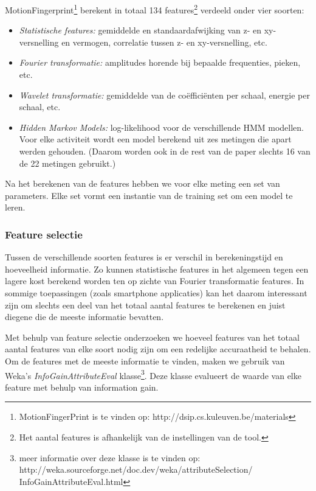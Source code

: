 \documentclass{article}
\begin{document}
MotionFingerprint\footnote{MotionFingerPrint is te vinden op: http://dsip.cs.kuleuven.be/materials} berekent in totaal 134 features\footnote{Het aantal features is afhankelijk van de instellingen van de tool.} verdeeld onder vier soorten:
\begin{itemize}
\item \textit{Statistische features:} gemiddelde en standaardafwijking van z- en xy-versnelling en vermogen, correlatie tussen z- en xy-versnelling, etc. 
 
\item \textit{Fourier transformatie:} amplitudes horende bij bepaalde frequenties, pieken, etc.

\item \textit{Wavelet transformatie:} gemiddelde van de co\"effici\"enten per schaal, energie per schaal, etc.

\item \textit{Hidden Markov Models:} log-likelihood voor de verschillende HMM modellen. Voor elke activiteit wordt een model berekend uit zes metingen die apart werden gehouden. (Daarom worden ook in de rest van de paper slechts 16 van de 22 metingen gebruikt.)
\end{itemize}


Na het berekenen van de features hebben we voor elke meting een set van parameters. Elke set vormt een instantie van de training set om een model te leren.

\subsubsection{Feature selectie}
Tussen de verschillende soorten features is er verschil in berekeningstijd en hoeveelheid informatie. Zo kunnen statistische features in het algemeen tegen een lagere kost berekend worden ten op zichte van Fourier transformatie features. In sommige toepassingen (zoals smartphone applicaties) kan het daarom interessant zijn om slechts een deel van het totaal aantal features te berekenen en juist diegene die de meeste informatie bevatten.

Met behulp van feature selectie onderzoeken we hoeveel features van het totaal aantal features van elke soort nodig zijn om een redelijke accuraatheid te behalen. Om de features met de meeste informatie te vinden, maken we gebruik van Weka's \emph{InfoGainAttributeEval} klasse\footnote{meer informatie over deze klasse is te vinden op: http://weka.sourceforge.net/doc.dev/weka/attributeSelection/
InfoGainAttributeEval.html}. %
 Deze klasse evalueert de waarde van elke feature met behulp van information gain.
\end{document}
